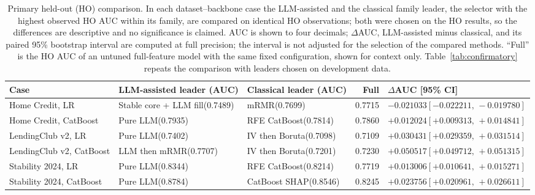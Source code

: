 \documentclass[final,5p,twocolumn]{elsarticle}
\begin{document}
\begin{table}[htbp]
\centering
\scriptsize
\setlength{\tabcolsep}{3pt}
\begin{threeparttable}
\caption{Primary held-out (HO) comparison. In each dataset--backbone case the LLM-assisted and the classical family leader, the selector with the highest observed HO AUC within its family, are compared on identical HO observations; both were chosen on the HO results, so the differences are descriptive and no significance is claimed. AUC is shown to four decimals; $\Delta$AUC, LLM-assisted minus classical, and its paired 95\% bootstrap interval are computed at full precision; the interval is not adjusted for the selection of the compared methods. ``Full'' is the HO AUC of an untuned full-feature model with the same fixed configuration, shown for context only. Table~\ref{tab:confirmatory} repeats the comparison with leaders chosen on development data.}
\label{tab:primary_results}
\begin{tabular}{@{}L{24mm}L{27mm}L{24mm}rL{40mm}@{}}
\toprule
Case & LLM-assisted leader (AUC) & Classical leader (AUC) & Full & $\Delta$AUC [95\% CI] \\
\midrule
Home Credit, LR & Stable core + LLM fill\newline (0.7489) & mRMR\newline (0.7699) & 0.7715 & $-0.021033$\newline $[-0.022211,\,-0.019780]$ \\
\addlinespace
Home Credit, CatBoost & Pure LLM\newline (0.7935) & RFE CatBoost\newline (0.7814) & 0.7860 & $+0.012024$\newline $[+0.009313,\,+0.014841]$ \\
\addlinespace
LendingClub v2, LR & Pure LLM\newline (0.7402) & IV then Boruta\newline (0.7098) & 0.7109 & $+0.030431$\newline $[+0.029359,\,+0.031514]$ \\
\addlinespace
LendingClub v2, CatBoost & LLM then mRMR\newline (0.7707) & IV then Boruta\newline (0.7201) & 0.7230 & $+0.050517$\newline $[+0.049712,\,+0.051315]$ \\
\addlinespace
Stability 2024, LR & Pure LLM\newline (0.8344) & RFE CatBoost\newline (0.8214) & 0.7719 & $+0.013006$\newline $[+0.010641,\,+0.015271]$ \\
\addlinespace
Stability 2024, CatBoost & Pure LLM\newline (0.8784) & CatBoost SHAP\newline (0.8546) & 0.8245 & $+0.023756$\newline $[+0.020961,\,+0.026611]$ \\
\bottomrule
\end{tabular}
\end{threeparttable}
\end{table}
\end{document}
